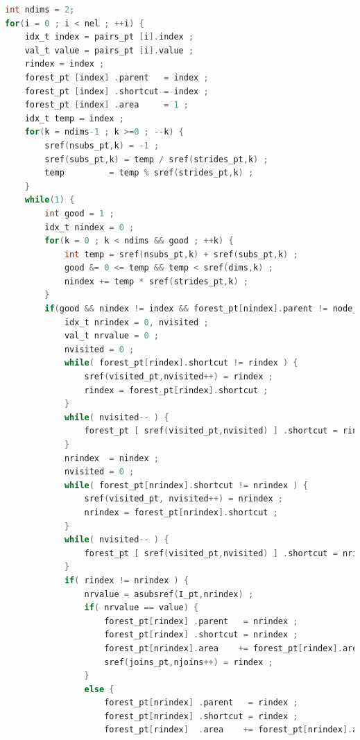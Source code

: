\begin{appendices}

\begin{lstlisting}[language=C,basicstyle=\small]
int ndims = 2;
for(i = 0 ; i < nel ; ++i) {
	idx_t index = pairs_pt [i].index ;    
	val_t value = pairs_pt [i].value ;
	rindex = index ;
	forest_pt [index] .parent   = index ;
	forest_pt [index] .shortcut = index ;
	forest_pt [index] .area     = 1 ;
	idx_t temp = index ;
	for(k = ndims-1 ; k >=0 ; --k) {
		sref(nsubs_pt,k) = -1 ;
		sref(subs_pt,k) = temp / sref(strides_pt,k) ;
		temp         = temp % sref(strides_pt,k) ;
	}
	while(1) {
		int good = 1 ;
		idx_t nindex = 0 ;
		for(k = 0 ; k < ndims && good ; ++k) {
			int temp = sref(nsubs_pt,k) + sref(subs_pt,k) ;
			good &= 0 <= temp && temp < sref(dims,k) ;
			nindex += temp * sref(strides_pt,k) ;
		}
		if(good && nindex != index && forest_pt[nindex].parent != node_is_void ) {
			idx_t nrindex = 0, nvisited ;
			val_t nrvalue = 0 ;
			nvisited = 0 ;
			while( forest_pt[rindex].shortcut != rindex ) {          
				sref(visited_pt,nvisited++) = rindex ;
				rindex = forest_pt[rindex].shortcut ;
			}      
			while( nvisited-- ) {
				forest_pt [ sref(visited_pt,nvisited) ] .shortcut = rindex ;
			}
			nrindex  = nindex ;
			nvisited = 0 ;
			while( forest_pt[nrindex].shortcut != nrindex ) {          
				sref(visited_pt, nvisited++) = nrindex ;
				nrindex = forest_pt[nrindex].shortcut ;
			}      
			while( nvisited-- ) {
				forest_pt [ sref(visited_pt,nvisited) ] .shortcut = nrindex ;
			}
			if( rindex != nrindex ) {
				nrvalue = asubsref(I_pt,nrindex) ;
				if( nrvalue == value) {
					forest_pt[rindex] .parent   = nrindex ;
					forest_pt[rindex] .shortcut = nrindex ;          
					forest_pt[nrindex].area    += forest_pt[rindex].area ;
					sref(joins_pt,njoins++) = rindex ;
				} 
				else {
					forest_pt[nrindex] .parent   = rindex ;
					forest_pt[nrindex] .shortcut = rindex ;
					forest_pt[rindex]  .area    += forest_pt[nrindex].area ;

\end{lstlisting}
\end{appendices}
